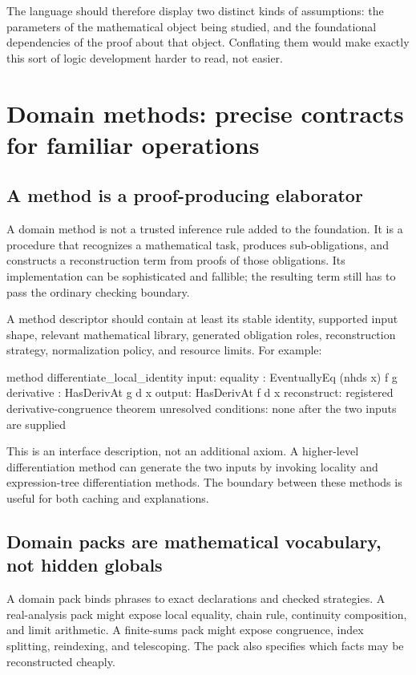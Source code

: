 \documentclass[11pt,a4paper]{article}
\theoremstyle{remark}
\begin{document}
The language should therefore display two distinct kinds of assumptions: the parameters of the mathematical object being studied, and the foundational dependencies of the proof about that object. Conflating them would make exactly this sort of logic development harder to read, not easier.

\section{Domain methods: precise contracts for familiar operations}\label{sec:methods}

\subsection{A method is a proof-producing elaborator}
A domain method is not a trusted inference rule added to the foundation. It is a procedure that recognizes a mathematical task, produces sub-obligations, and constructs a reconstruction term from proofs of those obligations. Its implementation can be sophisticated and fallible; the resulting term still has to pass the ordinary checking boundary.

A method descriptor should contain at least its stable identity, supported input shape, relevant mathematical library, generated obligation roles, reconstruction strategy, normalization policy, and resource limits. For example:
\Needspace{142pt}
\begin{code}
method differentiate_local_identity
  input:
    equality : EventuallyEq (nhds x) f g
    derivative : HasDerivAt g d x
  output:
    HasDerivAt f d x
  reconstruct:
    registered derivative-congruence theorem
  unresolved conditions:
    none after the two inputs are supplied
\end{code}
This is an interface description, not an additional axiom. A higher-level differentiation method can generate the two inputs by invoking locality and expression-tree differentiation methods. The boundary between these methods is useful for both caching and explanations.

\subsection{Domain packs are mathematical vocabulary, not hidden globals}
A domain pack binds phrases to exact declarations and checked strategies. A real-analysis pack might expose local equality, chain rule, continuity composition, and limit arithmetic. A finite-sums pack might expose congruence, index splitting, reindexing, and telescoping. The pack also specifies which facts may be reconstructed cheaply.
\end{document}
